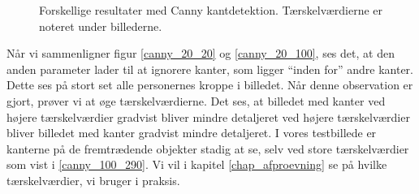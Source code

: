 {\begin{figure}[!p]
    \caption[]{Forskellige resultater med Canny kantdetektion.
    Tærskelværdierne er noteret under billederne.}
    \label{canny_kanter}
\end{figure}

Når vi sammenligner figur \ref{canny_20_20} og \ref{canny_20_100}, ses
det, at den anden parameter lader til at ignorere kanter, som ligger
``inden for'' andre kanter. Dette ses på stort set alle personernes
kroppe i billedet. Når denne observation er gjort, prøver vi at øge
tærskelværdierne. Det ses, at billedet med kanter ved højere
tærskelværdier gradvist bliver mindre detaljeret ved højere
tærskelværdier bliver billedet med kanter gradvist mindre detaljeret. I
vores testbillede er kanterne på de fremtrædende objekter stadig at se,
selv ved store tærskelværdier som vist i \ref{canny_100_290}. Vi vil i
kapitel \ref{chap_afproevning} se på hvilke tærskelværdier, vi bruger i
praksis.
}


